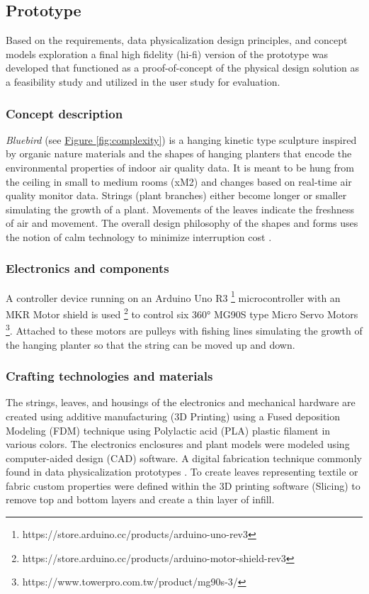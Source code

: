 \subsection{Prototype}

Based on the requirements, data physicalization design principles, and concept models exploration a final high fidelity (hi-fi) version of the prototype was developed that functioned as a proof-of-concept of the physical design solution as a feasibility study and utilized in the user study for evaluation.



\subsubsection{Concept description}

\textit{Bluebird} (see \hyperref[fig:complexity]{Figure \ref*{fig:complexity}}) is a hanging kinetic type sculpture inspired by organic nature materials and the shapes of hanging planters that encode the environmental properties of indoor air quality data. It is meant to be hung from the ceiling in small to medium rooms (xM2) and changes based on real-time air quality monitor data. Strings (plant branches) either become longer or smaller simulating the growth of a plant. Movements of the leaves indicate the freshness of air and movement. The overall design philosophy of the shapes and forms uses the notion of calm technology to minimize interruption cost \cite{case_calm_2016}. 

\subsubsection{Electronics and components}

A controller device running on an Arduino Uno R3 \footnote{https://store.arduino.cc/products/arduino-uno-rev3} microcontroller with an MKR Motor shield is used \footnote{https://store.arduino.cc/products/arduino-motor-shield-rev3} to control six 360° MG90S type Micro Servo Motors \footnote{https://www.towerpro.com.tw/product/mg90s-3/}. Attached to these motors are pulleys with fishing lines simulating the growth of the hanging planter so that the string can be moved up and down.


\subsubsection{Crafting technologies and materials}
The strings, leaves, and housings of the electronics and mechanical hardware are created using additive manufacturing (3D Printing) using a Fused deposition Modeling (FDM) technique using Polylactic acid (PLA) plastic filament in various colors. The electronics enclosures and plant models were modeled using computer-aided design (CAD) software. A digital fabrication technique commonly found in data physicalization prototypes \cite{anhalt_university_germany_design_2022}. To create leaves representing textile or fabric custom properties were defined within the 3D printing software (Slicing) to remove top and bottom layers and create a thin layer of infill.

